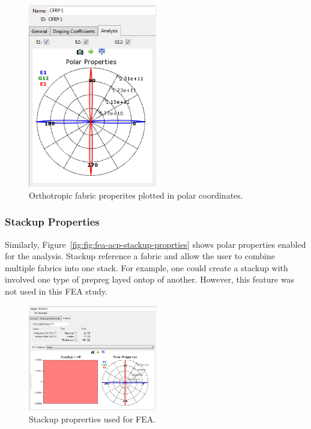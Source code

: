 \begin{figure}[htp]
\centering
\includegraphics[width=0.5\textwidth]{./figures/fea/fea-acp-fabric-properties-polar}
\caption{Orthotropic fabric properites plotted in polar coordinates.}
\label{fig:fea-acp-fabric-properties-polar}
\end{figure}

\clearpage

\subsubsection{Stackup Properties}

\indent

Similarly, Figure~\ref{fig:fig:fea-acp-stackup-proprties} shows polar properties enabled for the analysis. Stackup reference a fabric and allow the user to combine multiple fabrics into one stack. For example, one could create a stackup with involved one type of prepreg layed ontop of another. However, this feature was not used in this FEA study.

\begin{figure}[htp]
\centering
\includegraphics[width=0.5\textwidth]{./figures/fea/fea-acp-stackup-proprties}
\caption{Stackup proprerties used for FEA.}
\label{fig:fea-acp-stackup-proprties}
\end{figure}

